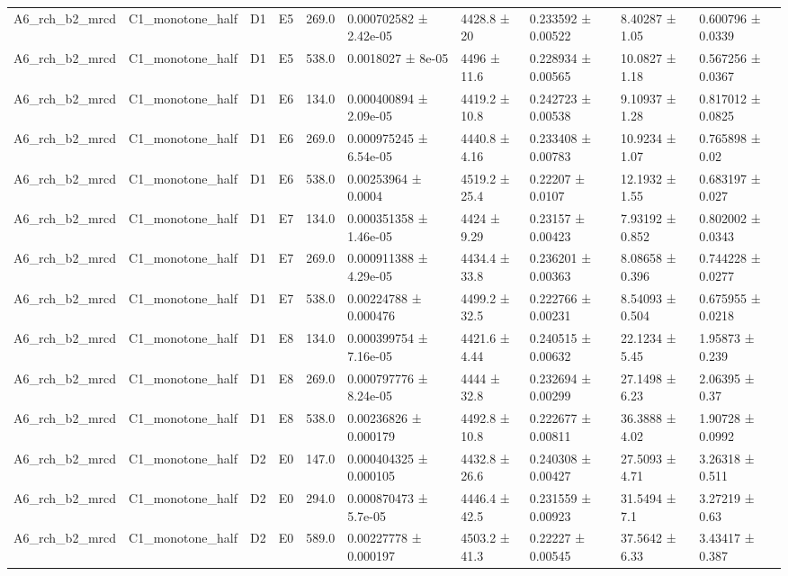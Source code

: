 \begin{table}
\begin{tabular}{llllllllll}
A6\_rch\_b2\_mrcd & C1\_monotone\_half & D1 & E5 & 269.0 & 0.000702582 ± 2.42e-05 & 4428.8 ± 20 & 0.233592 ± 0.00522 & 8.40287 ± 1.05 & 0.600796 ± 0.0339 \\
A6\_rch\_b2\_mrcd & C1\_monotone\_half & D1 & E5 & 538.0 & 0.0018027 ± 8e-05 & 4496 ± 11.6 & 0.228934 ± 0.00565 & 10.0827 ± 1.18 & 0.567256 ± 0.0367 \\
A6\_rch\_b2\_mrcd & C1\_monotone\_half & D1 & E6 & 134.0 & 0.000400894 ± 2.09e-05 & 4419.2 ± 10.8 & 0.242723 ± 0.00538 & 9.10937 ± 1.28 & 0.817012 ± 0.0825 \\
A6\_rch\_b2\_mrcd & C1\_monotone\_half & D1 & E6 & 269.0 & 0.000975245 ± 6.54e-05 & 4440.8 ± 4.16 & 0.233408 ± 0.00783 & 10.9234 ± 1.07 & 0.765898 ± 0.02 \\
A6\_rch\_b2\_mrcd & C1\_monotone\_half & D1 & E6 & 538.0 & 0.00253964 ± 0.0004 & 4519.2 ± 25.4 & 0.22207 ± 0.0107 & 12.1932 ± 1.55 & 0.683197 ± 0.027 \\
A6\_rch\_b2\_mrcd & C1\_monotone\_half & D1 & E7 & 134.0 & 0.000351358 ± 1.46e-05 & 4424 ± 9.29 & 0.23157 ± 0.00423 & 7.93192 ± 0.852 & 0.802002 ± 0.0343 \\
A6\_rch\_b2\_mrcd & C1\_monotone\_half & D1 & E7 & 269.0 & 0.000911388 ± 4.29e-05 & 4434.4 ± 33.8 & 0.236201 ± 0.00363 & 8.08658 ± 0.396 & 0.744228 ± 0.0277 \\
A6\_rch\_b2\_mrcd & C1\_monotone\_half & D1 & E7 & 538.0 & 0.00224788 ± 0.000476 & 4499.2 ± 32.5 & 0.222766 ± 0.00231 & 8.54093 ± 0.504 & 0.675955 ± 0.0218 \\
A6\_rch\_b2\_mrcd & C1\_monotone\_half & D1 & E8 & 134.0 & 0.000399754 ± 7.16e-05 & 4421.6 ± 4.44 & 0.240515 ± 0.00632 & 22.1234 ± 5.45 & 1.95873 ± 0.239 \\
A6\_rch\_b2\_mrcd & C1\_monotone\_half & D1 & E8 & 269.0 & 0.000797776 ± 8.24e-05 & 4444 ± 32.8 & 0.232694 ± 0.00299 & 27.1498 ± 6.23 & 2.06395 ± 0.37 \\
A6\_rch\_b2\_mrcd & C1\_monotone\_half & D1 & E8 & 538.0 & 0.00236826 ± 0.000179 & 4492.8 ± 10.8 & 0.222677 ± 0.00811 & 36.3888 ± 4.02 & 1.90728 ± 0.0992 \\
A6\_rch\_b2\_mrcd & C1\_monotone\_half & D2 & E0 & 147.0 & 0.000404325 ± 0.000105 & 4432.8 ± 26.6 & 0.240308 ± 0.00427 & 27.5093 ± 4.71 & 3.26318 ± 0.511 \\
A6\_rch\_b2\_mrcd & C1\_monotone\_half & D2 & E0 & 294.0 & 0.000870473 ± 5.7e-05 & 4446.4 ± 42.5 & 0.231559 ± 0.00923 & 31.5494 ± 7.1 & 3.27219 ± 0.63 \\
A6\_rch\_b2\_mrcd & C1\_monotone\_half & D2 & E0 & 589.0 & 0.00227778 ± 0.000197 & 4503.2 ± 41.3 & 0.22227 ± 0.00545 & 37.5642 ± 6.33 & 3.43417 ± 0.387 \\

\end{tabular}
\end{table}
